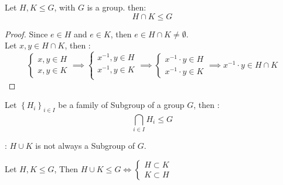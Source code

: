 \begin{proposition}
  Let $H, K \leq G $, with $G $ is a group. then: 
  \[
  H \cap K \leq G
  \]
\end{proposition}
  \begin{proof}
    Since $e \in H $ and $e \in  K$, then $e \in  H \cap K \neq  \emptyset $. \\
    Let $x,y \in  H \cap K $, then : 
    \[
    \begin{cases}
    x,y \in  H \\
    x,y \in  K
    \end{cases} \implies 
    \begin{cases}
    x^{-1}, y \in  H \\
    x^{-1}, y \in  K \\
    \end{cases}
    \implies  
    \begin{cases}
    x^{-1} \cdot y \in H \\
    x^{-1} \cdot y \in K
    \end{cases}
    \implies x^{-1} \cdot y \in H \cap K
    \]
  \end{proof}
 \begin{proposition}
   Let $\left\{ H_{i} \right\}_{i \in  I} $ be a family of Subgroup of a group $G $, then : 
   \[
     \bigcap_{i \in  I}^{} H_{i} \leq G
   \]
 \end{proposition}

 \underline{}: $H \cup K $ is not always a Subgroup of $G $.
 \begin{proposition}
   Let $H, K \leq G$, Then $H \cup K \leq G \iff  \begin{cases}
   H \subset K \\
   K \subset H
   \end{cases}$  
 \end{proposition}
 
 

